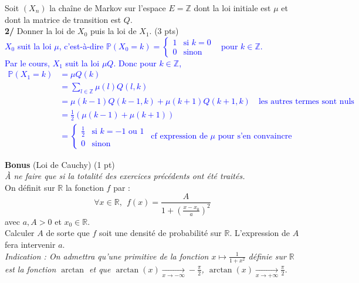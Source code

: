 \documentclass[a4paper,12pt]{article}
\newcommand{\prob}{\mathbb{P}}
\begin{document}
Soit $(X_n)$ la chaîne de Markov sur l'espace $E=\mathbb{Z}$ dont la loi initiale est $\mu$ et dont la matrice de transition est $Q$. \\

\textbf{2/} Donner la loi de $X_0$ puis la loi de $X_1$. (3 pts)\\

\textcolor{blue}{
$X_0$ suit la loi $\mu$, c'est-à-dire 
$
\prob(X_0 = k) =
\begin{cases} 
1 & \text{si } k = 0 \\
0 & \text{sinon}
\end{cases}
$ \ pour $k \in \mathbb{Z}$. \\
Par le cours, $X_1$ suit la loi $\mu Q$. Donc pour $k \in \mathbb{Z}$,
\begin{align*}
\prob(X_1 = k) & = \mu Q(k) \\
& = \sum_{l \in \mathbb{Z}} \mu(l) Q(l, k) \\
& = \mu(k-1) Q(k-1, k) + \mu(k+1) Q(k+1, k) \quad \text{les autres termes sont nuls} \\
& = \frac{1}{2} (\mu(k-1) + \mu(k+1)) \\
& \boxed{= \begin{cases} 
\frac{1}{2} & \text{si } k = -1 \text{ ou } 1 \\
0 & \text{sinon}
\end{cases}} \ \ \text{cf expression de } \mu \text{ pour s'en convaincre}
\end{align*}
}

\textbf{Bonus} (Loi de Cauchy) (1 pt) \\
\textit{À ne faire que si la totalité des exercices précédents ont été traités.} \\
On définit sur $\mathbb{R}$ la fonction $f$ par : 
$$\forall x \in \mathbb{R}, \ \ f(x)=\frac{A}{1+\left( \frac{x-x_0}{a}  \right)^2}$$ 
avec $a, A >0$ et $x_0 \in \mathbb{R}$.\\

Calculer $A$ de sorte que $f$ soit une densité de probabilité sur $\mathbb{R}$. L'expression de $A$ fera intervenir $a$. \\
\textit{Indication : On admettra qu'une primitive de la fonction $x \mapsto \frac{1}{1+x^2}$ définie sur $\mathbb{R}$ est la fonction $\arctan$ et que $\arctan(x) \xrightarrow[x \to -\infty]{} -\frac{\pi}{2}$, $\arctan(x) \xrightarrow[x \to +\infty]{} \frac{\pi}{2}$}. \\
\end{document}

